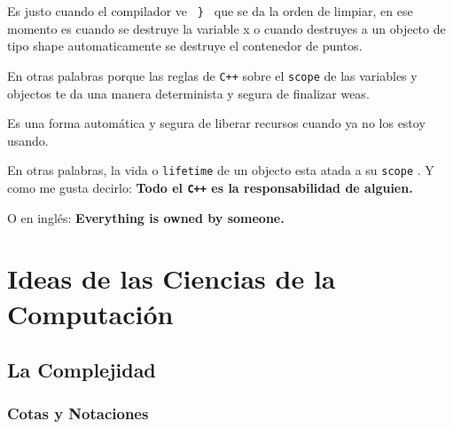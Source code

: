 \documentclass[12pt, fleqn]{report}                             %
\theoremstyle{break}                                            %
\newcommand{\textCode}[1]  { \texttt{#1} }                      %
\newcommand \Cpp  {\textCode{C++} }                               %
\begin{document}
            Es justo cuando el compilador ve \textCode{ \} } que se da la orden de limpiar,
            en ese momento es cuando se destruye la variable x o cuando destruyes a un objecto
            de tipo shape automaticamente se destruye el contenedor de puntos.
            
            En otras palabras porque las reglas de \Cpp sobre el \textCode{scope} de las variables
            y objectos te da una manera determinista y segura de finalizar weas.

            Es una forma automática y segura de liberar recursos cuando ya no los estoy usando.

            En otras palabras, la vida o \textCode{lifetime} de un objecto esta atada a su \textCode{scope}.
            Y como me gusta decirlo:
            \textbf{
                Todo el \Cpp es la responsabilidad de alguien.
            }

            O en inglés:
            \textbf{
                Everything is owned by someone.
            }

            \cite{ModernCppWhatYouNeedToKnow}



\part{Ideas de las Ciencias de la Computación}
\label{part:IdeasDeCienciasDeLaComputacion}
    

    \clearpage
    \chapter{La Complejidad}

        \section{Cotas y Notaciones}
\end{document}

